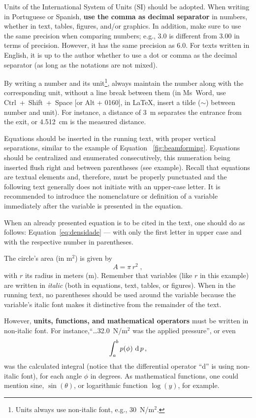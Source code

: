 \documentclass[12pt, a4paper, twoside, twocolumn]{article}
\begin{document}
Units of the International System of Units (SI) should be adopted. When writing in Portuguese or Spanish, \textbf{use the comma as decimal separator} in numbers, whether in text, tables, figures, and/or graphics. In addition, make sure to use the same precision when comparing numbers; e.g., 3.0 is different from 3.00 in terms of precision. However, it has the same precision as 6.0. For texts written in English, it is up to the author whether to use a dot or comma as the decimal separator (as long as the notations are not mixed). 

By writing a number and its unit\footnote{Units always use non-italic font, e.g., 30~N/m$^2$.}, always maintain the number along with the corresponding unit, without a line break between them (in Ms~Word, use Ctrl~+~Shift~+~Space [or Alt + 0160], in \LaTeX, insert a tilde ($\sim$) between number and unit). For instance, a distance of 3~m separates the entrance from the exit, or 4.512~cm is the measured distance.

Equations should be inserted in the running text, with proper vertical separations, similar to the example of Equation ~\eqref{fig:beamforming}. Equations should be centralized and enumerated consecutively, this numeration being inserted flush right and between parentheses (see example). Recall that equations are textual elements and, therefore, must be properly punctuated and the following text generally does not initiate with an upper-case letter. It is recommended to introduce the nomenclature or definition of a variable immediately after the variable is presented in the equation.

When an already presented equation is to be cited in the text, one should do as follows: Equation~\eqref{eq:densidade} --- with only the first letter in upper case and with the respective number in parentheses.

The circle's area (in m$^2$) is given by
\begin{equation}
	A = \pi \, r^2\;,
\label{eq:area-circ}
\end{equation}
with $r$ its radius in meters (m). 
%
Remember that variables (like $r$ in this example) are written in \textit{italic} (both in equations, text, tables, or figures). When in the running text, no parentheses should be used around the variable because the variable's italic font makes it distinctive from the remainder of the text. 

However, \textbf{units, functions, and mathematical operators} must be written in non-italic font. For instance,``\ldots  32.0~N/m$^2$ was the applied pressure'', or even
%
\begin{equation}
	\int_a^b p(\phi)\, \operatorname{d} p\,,
\label{eq:int}
\end{equation}
%
was the calculated integral (notice that the differential operator ``d'' is using non-italic font), for each angle $\phi$ in degrees. As mathematical functions, one could mention sine, $\sin(\theta)$, or logarithmic function $\log(y)$, for example.
\end{document}
